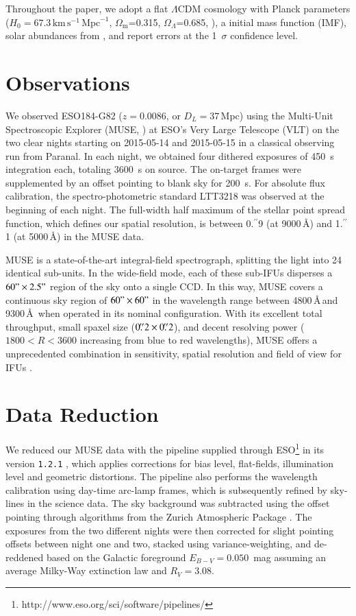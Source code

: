 \documentclass[traditabstract]{aa}
\newcommand{\farc}{\hbox{$.\!\!^{\prime\prime}$}}
\begin{document}
Throughout the paper, we adopt a flat $\Lambda$CDM cosmology with Planck parameters ($H_0=67.3\,\mathrm{km}\,\mathrm{s}^{-1}\,\mathrm{Mpc}^{-1}$, $\Omega_\mathrm{m}$=0.315, $\Omega_\Lambda$=0.685, \citealt{2014A&A...571A..16P}), a \citet{2003PASP..115..763C} initial mass function (IMF), solar abundances from \citet{2009ARA&A..47..481A}, and report errors at the 1~$\sigma$ confidence level.

\section{Observations}

We observed ESO184-G82 ($z=0.0086$, or $D_L=37$\,Mpc) using the Multi-Unit Spectroscopic Explorer (MUSE, \citealp{2010SPIE.7735E..08B}) at ESO's Very Large Telescope (VLT) on the two clear nights starting on 2015-05-14 and 2015-05-15 in a classical observing run from Paranal. In each night, we obtained four dithered exposures of 450~s integration each, totaling 3600~s on source. The on-target frames were supplemented by an offset pointing to blank sky for 200~s. For absolute flux calibration, the spectro-photometric standard LTT3218 was observed at the beginning of each night. The full-width half maximum of the stellar point spread function, which defines our spatial resolution, is between 0\farc{9} (at 9000\,\AA) and 1\farc{1} (at 5000\,\AA) in the MUSE data.

MUSE is a state-of-the-art integral-field spectrograph, splitting the light into 24 identical sub-units. In the wide-field mode, each of these sub-IFUs disperses a $60"\times 2.5"$ region of the sky onto a single CCD. In this way, MUSE covers a continuous sky region of $60"\times 60"$ in the wavelength range between 4800\,\AA\,and 9300\,\AA\, when operated in its nominal configuration. With its excellent total throughput, small spaxel size ($0\farc{2} \times 0\farc{2}$), and decent resolving power ($1800 < R < 3600$ increasing from blue to red wavelengths), MUSE offers a unprecedented combination in sensitivity, spatial resolution and field of view for IFUs \citep{2010SPIE.7735E..08B}.

\section{Data Reduction}
\label{sec:red}
We reduced our MUSE data with the pipeline supplied through ESO\footnote{http://www.eso.org/sci/software/pipelines/} in its version \texttt{1.2.1} \citep{2014ASPC..485..451W}, which applies corrections for bias level, flat-fields, illumination level and geometric distortions. The pipeline also performs the wavelength calibration using day-time arc-lamp frames, which is subsequently refined by sky-lines in the science data. The sky background was subtracted using the offset pointing through algorithms from the Zurich Atmospheric Package \citep{2016MNRAS.458.3210S}. The exposures from the two different nights were then corrected for slight pointing offsets between night one and two, stacked using variance-weighting, and de-reddened based on the Galactic foreground $E_{B-V}=0.050$~mag \citep{2011ApJ...737..103S} assuming an average Milky-Way extinction law \citep{1992ApJ...395..130P} and $R_V=3.08$. 
\end{document}
